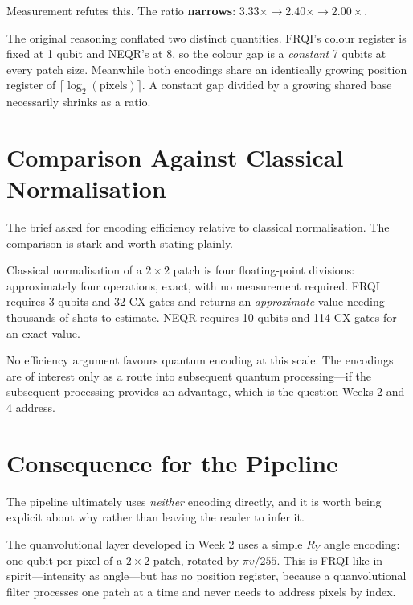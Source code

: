 \documentclass[11pt,a4paper]{article}
\begin{document}
Measurement refutes this. The ratio \textbf{narrows}: $3.33\times \rightarrow
2.40\times \rightarrow 2.00\times$.

The original reasoning conflated two distinct quantities. FRQI's colour register
is fixed at 1 qubit and NEQR's at 8, so the colour gap is a \emph{constant} 7
qubits at every patch size. Meanwhile both encodings share an identically growing
position register of $\lceil\log_2(\text{pixels})\rceil$. A constant gap divided
by a growing shared base necessarily shrinks as a ratio.


\section{Comparison Against Classical Normalisation}

The brief asked for encoding efficiency relative to classical normalisation. The
comparison is stark and worth stating plainly.

Classical normalisation of a $2\times2$ patch is four floating-point divisions:
approximately four operations, exact, with no measurement required. FRQI requires
3 qubits and 32 CX gates and returns an \emph{approximate} value needing
thousands of shots to estimate. NEQR requires 10 qubits and 114 CX gates for an
exact value.

No efficiency argument favours quantum encoding at this scale. The encodings are
of interest only as a route into subsequent quantum processing---if the
subsequent processing provides an advantage, which is the question Weeks 2 and 4
address.

\section{Consequence for the Pipeline}

The pipeline ultimately uses \emph{neither} encoding directly, and it is worth
being explicit about why rather than leaving the reader to infer it.

The quanvolutional layer developed in Week 2 uses a simple $R_Y$ angle encoding:
one qubit per pixel of a $2\times2$ patch, rotated by $\pi v/255$. This is
FRQI-like in spirit---intensity as angle---but has no position register, because
a quanvolutional filter processes one patch at a time and never needs to address
pixels by index.
\end{document}
